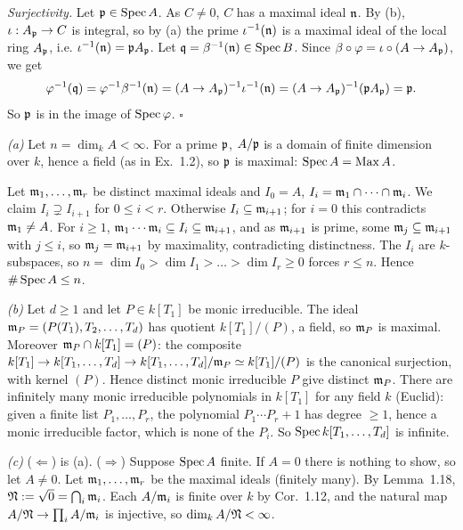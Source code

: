 \documentclass[11pt]{article}
\begin{document}
\emph{Surjectivity.} Let $\mathfrak p\in\operatorname{Spec} A$. As $C\ne0$, $C$ has a maximal ideal $\mathfrak n$. By (b), $\iota:A_\mathfrak p\to C$ is integral, so by (a) the prime $\iota^{-1}(\mathfrak n)$ is a maximal ideal of the local ring $A_\mathfrak p$, i.e. $\iota^{-1}(\mathfrak n)=\mathfrak p A_\mathfrak p$. Let $\mathfrak q=\beta^{-1}(\mathfrak n)\in\operatorname{Spec} B$. Since $\beta\circ\varphi=\iota\circ(A\to A_\mathfrak p)$, we get
\[ \varphi^{-1}(\mathfrak q)=\varphi^{-1}\beta^{-1}(\mathfrak n)=(A\to A_\mathfrak p)^{-1}\iota^{-1}(\mathfrak n)=(A\to A_\mathfrak p)^{-1}(\mathfrak p A_\mathfrak p)=\mathfrak p. \]
So $\mathfrak p$ is in the image of $\operatorname{Spec}\varphi$. \hfill$\square$

\pf
\emph{(a)} Let $n=\dim_kA<\infty$. For a prime $\mathfrak p$, $A/\mathfrak p$ is a domain of finite dimension over $k$, hence a field (as in Ex.~1.2), so $\mathfrak p$ is maximal: $\operatorname{Spec} A=\operatorname{Max} A$.

Let $\mathfrak m_1,\dots,\mathfrak m_r$ be distinct maximal ideals and $I_0=A$, $I_i=\mathfrak m_1\cap\dots\cap\mathfrak m_i$. We claim $I_{i}\supsetneq I_{i+1}$ for $0\le i<r$. Otherwise $I_i\subseteq\mathfrak m_{i+1}$; for $i=0$ this contradicts $\mathfrak m_1\ne A$. For $i\ge1$, $\mathfrak m_1\cdots\mathfrak m_i\subseteq I_i\subseteq\mathfrak m_{i+1}$, and as $\mathfrak m_{i+1}$ is prime, some $\mathfrak m_j\subseteq\mathfrak m_{i+1}$ with $j\le i$, so $\mathfrak m_j=\mathfrak m_{i+1}$ by maximality, contradicting distinctness. The $I_i$ are $k$-subspaces, so $n=\dim I_0>\dim I_1>\dots>\dim I_r\ge0$ forces $r\le n$. Hence $\#\operatorname{Spec} A\le n$.

\emph{(b)} Let $d\ge1$ and let $P\in k[T_1]$ be monic irreducible. The ideal $\mathfrak m_P=(P(T_1),T_2,\dots,T_d)$ has quotient $k[T_1]/(P)$, a field, so $\mathfrak m_P$ is maximal. Moreover $\mathfrak m_P\cap k[T_1]=(P)$: the composite $k[T_1]\to k[T_1,\dots,T_d]\to k[T_1,\dots,T_d]/\mathfrak m_P\simeq k[T_1]/(P)$ is the canonical surjection, with kernel $(P)$. Hence distinct monic irreducible $P$ give distinct $\mathfrak m_P$. There are infinitely many monic irreducible polynomials in $k[T_1]$ for any field $k$ (Euclid): given a finite list $P_1,\dots,P_r$, the polynomial $P_1\cdots P_r+1$ has degree $\ge1$, hence a monic irreducible factor, which is none of the $P_i$. So $\operatorname{Spec} k[T_1,\dots,T_d]$ is infinite.

\emph{(c)} ($\Leftarrow$) is (a). ($\Rightarrow$) Suppose $\operatorname{Spec} A$ finite. If $A=0$ there is nothing to show, so let $A\neq0$. Let $\mathfrak m_1,\dots,\mathfrak m_r$ be the maximal ideals (finitely many). By Lemma~1.18, $\mathfrak N:=\sqrt0=\bigcap_i\mathfrak m_i$. Each $A/\mathfrak m_i$ is finite over $k$ by Cor.~1.12, and the natural map $A/\mathfrak N\to\prod_iA/\mathfrak m_i$ is injective, so $\dim_kA/\mathfrak N<\infty$.
\end{document}
